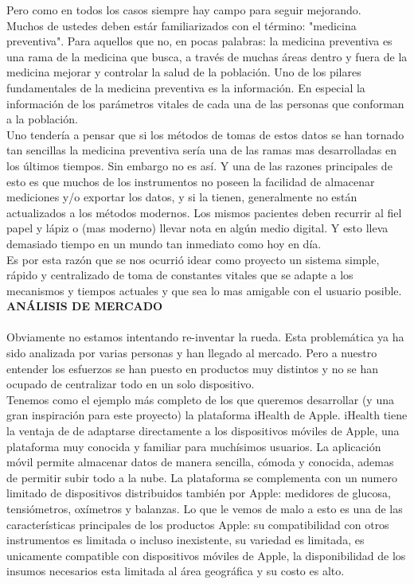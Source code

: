 \documentclass[11pt]{report}
\begin{document}
Pero como en todos los casos siempre hay campo para seguir mejorando.\\

Muchos de ustedes deben estár familiarizados con el término: "medicina preventiva". Para aquellos que no, en pocas palabras: la medicina preventiva es una rama de la medicina que busca, a través de muchas áreas dentro y fuera de la medicina mejorar y controlar la salud de la población. Uno de los pilares fundamentales de la medicina preventiva es la información. En especial la información de los parámetros vitales de cada una de las personas que conforman a la población.\\

Uno tendería a pensar que si los métodos de tomas de estos datos se han tornado tan sencillas la medicina preventiva sería una de las ramas mas desarrolladas en los últimos tiempos. Sin embargo no es así. Y una de las razones principales de esto es que muchos de los instrumentos no poseen la facilidad de almacenar mediciones y/o exportar
los datos, y si la tienen, generalmente  no están actualizados a los métodos modernos.
Los mismos pacientes deben recurrir al fiel papel y lápiz o (mas moderno) llevar nota en algún medio digital. Y esto lleva demasiado tiempo en un mundo tan inmediato como hoy en día.\\

Es por esta razón que se nos ocurrió idear como proyecto un sistema simple, rápido y centralizado de toma de constantes vitales que se adapte a los mecanismos y tiempos actuales y que sea lo mas amigable con el usuario posible.\\


\newpage
\noindent \Large \textbf{ANÁLISIS DE MERCADO} \\
\\

Obviamente no estamos intentando re-inventar la rueda. Esta problemática ya ha sido analizada por varias personas y han llegado al mercado. Pero a nuestro entender los esfuerzos se han puesto en productos muy distintos y no se han ocupado de centralizar todo en un solo dispositivo.\\

Tenemos como el ejemplo más completo de los que queremos desarrollar (y una gran inspiración para este proyecto) la plataforma iHealth de Apple. iHealth tiene la ventaja de de adaptarse directamente a los dispositivos móviles de Apple, una plataforma muy conocida y familiar para muchísimos usuarios. La aplicación móvil permite almacenar datos de manera sencilla, cómoda y conocida, ademas de permitir subir todo a la nube. La plataforma se complementa con un numero limitado de dispositivos distribuidos también por Apple: medidores de glucosa, tensiómetros, oxímetros y
balanzas. Lo que le vemos de malo a esto es una de las características principales de los productos Apple: su compatibilidad con otros instrumentos es limitada o incluso inexistente, su variedad es limitada, es unicamente compatible con dispositivos móviles de Apple, la disponibilidad de los insumos necesarios esta limitada al área geográfica y su costo es alto.\\
\end{document}

